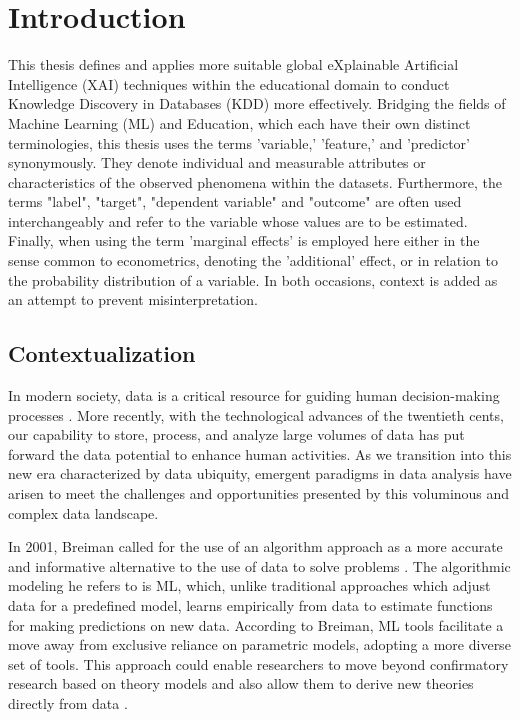 \chapter{Introduction}
\label{contextualizacao}
This thesis defines and applies more suitable global eXplainable Artificial Intelligence (XAI) techniques within the educational domain to conduct Knowledge Discovery in Databases (KDD) more effectively. Bridging the fields of Machine Learning (ML) and Education, which each have their own distinct terminologies, this thesis uses the terms 'variable,' 'feature,' and 'predictor' synonymously. They denote individual and measurable attributes or characteristics of the observed phenomena within the datasets.  Furthermore, the terms "label", "target", "dependent variable" and "outcome" are often used interchangeably and refer to the variable whose values are to be estimated.  Finally, when using the term 'marginal effects' is employed here either in the sense common to econometrics, denoting the 'additional' effect, or in relation to the probability distribution of a variable. In both occasions, context is added as an attempt to prevent  misinterpretation. 

\section{Contextualization}

In modern society, data is a critical resource for guiding human decision-making processes \cite{J.Han2012DataTechniques}. More recently, with the technological advances of the twentieth cents, our capability to store, process, and analyze large volumes of data has put forward the data potential to enhance human activities. As we transition into this new era characterized by data ubiquity, emergent paradigms in data analysis have arisen to meet the challenges and opportunities presented by this voluminous and complex data landscape. 

In 2001, Breiman called for the use of an algorithm approach as a more accurate and informative alternative to the use of data to solve problems \cite{Breiman2001StatisticalAuthor}. The algorithmic modeling he refers to is ML, which, unlike traditional approaches which adjust data for a predefined model, learns empirically from data to estimate functions for making predictions on new data. According to Breiman, ML tools facilitate a move away from exclusive reliance on parametric models, adopting a more diverse set of tools. This approach could enable researchers to move beyond confirmatory research based on theory models and also allow them to derive new theories directly from data \cite{Molina2019AnnualSociology}.

